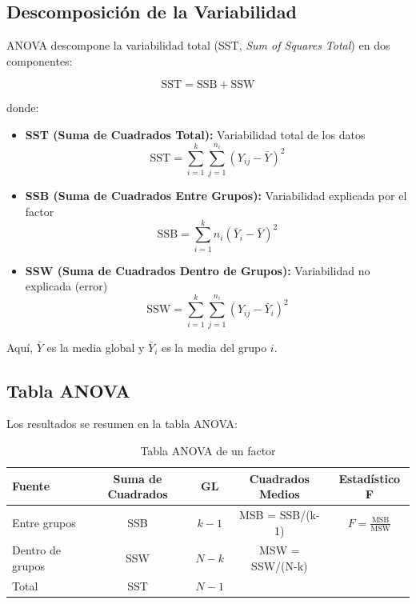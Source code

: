 \documentclass[11pt,a4paper]{article}
\theoremstyle{definition}
\begin{document}
\subsection{Descomposición de la Variabilidad}

ANOVA descompone la variabilidad total (SST, \textit{Sum of Squares Total}) en dos componentes:

\begin{equation}
\text{SST} = \text{SSB} + \text{SSW}
\end{equation}

donde:
\begin{itemize}
    \item \textbf{SST (Suma de Cuadrados Total):} Variabilidad total de los datos
    \begin{equation}
    \text{SST} = \sum_{i=1}^{k} \sum_{j=1}^{n_i} (Y_{ij} - \bar{Y})^2
    \end{equation}
    
    \item \textbf{SSB (Suma de Cuadrados Entre Grupos):} Variabilidad explicada por el factor
    \begin{equation}
    \text{SSB} = \sum_{i=1}^{k} n_i (\bar{Y}_i - \bar{Y})^2
    \end{equation}
    
    \item \textbf{SSW (Suma de Cuadrados Dentro de Grupos):} Variabilidad no explicada (error)
    \begin{equation}
    \text{SSW} = \sum_{i=1}^{k} \sum_{j=1}^{n_i} (Y_{ij} - \bar{Y}_i)^2
    \end{equation}
\end{itemize}

Aquí, $\bar{Y}$ es la media global y $\bar{Y}_i$ es la media del grupo $i$.

\subsection{Tabla ANOVA}

Los resultados se resumen en la tabla ANOVA:

\begin{table}[H]
\centering
\begin{tabular}{lcccc}
\toprule
Fuente & Suma de Cuadrados & GL & Cuadrados Medios & Estadístico F \\
\midrule
Entre grupos & SSB & $k-1$ & MSB = SSB/(k-1) & $F = \frac{\text{MSB}}{\text{MSW}}$ \\
Dentro de grupos & SSW & $N-k$ & MSW = SSW/(N-k) & \\
Total & SST & $N-1$ & & \\
\bottomrule
\end{tabular}
\caption{Tabla ANOVA de un factor}
\end{table}
\end{document}
